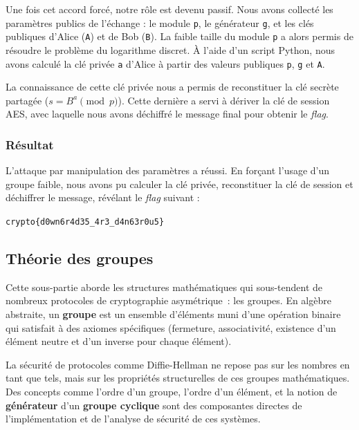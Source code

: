     Une fois cet accord forcé, notre rôle est devenu passif. Nous avons
    collecté les paramètres publics de l'échange : le module \texttt{p}, le
    générateur \texttt{g}, et les clés publiques d'Alice (\texttt{A}) et de
    Bob (\texttt{B}). La faible taille du module \texttt{p} a alors permis de
    résoudre le problème du logarithme discret. À l'aide d'un script Python, nous
    avons calculé la clé privée \texttt{a} d'Alice à partir des valeurs publiques
    \texttt{p}, \texttt{g} et \texttt{A}.

    La connaissance de cette clé privée nous a permis de reconstituer la clé
    secrète partagée ($s = B^a \pmod{p}$). Cette dernière a servi à dériver la
    clé de session AES, avec laquelle nous avons déchiffré le message final
    pour obtenir le \textit{flag}.

    \subsubsection{Résultat}
    L'attaque par manipulation des paramètres a réussi. En forçant l'usage d'un
    groupe faible, nous avons pu calculer la clé privée, reconstituer la clé de
    session et déchiffrer le message, révélant le \textit{flag} suivant :

    \begin{center}
        \texttt{crypto\{d0wn6r4d35\_4r3\_d4n63r0u5\}}
    \end{center}

    \subsection{Théorie des groupes}
    Cette sous-partie aborde les structures mathématiques qui sous-tendent de
    nombreux protocoles de cryptographie asymétrique~: les groupes. En
    algèbre abstraite, un \textbf{groupe} est un ensemble d'éléments muni d'une
    opération binaire qui satisfait à des axiomes spécifiques (fermeture,
    associativité, existence d'un élément neutre et d'un inverse pour chaque
    élément).

    La sécurité de protocoles comme Diffie-Hellman ne repose pas sur les
    nombres en tant que tels, mais sur les propriétés structurelles de ces
    groupes mathématiques. Des concepts comme l'ordre d'un groupe, l'ordre
    d'un élément, et la notion de \textbf{générateur} d'un \textbf{groupe
    cyclique} sont des composantes directes de l'implémentation et de
    l'analyse de sécurité de ces systèmes.

